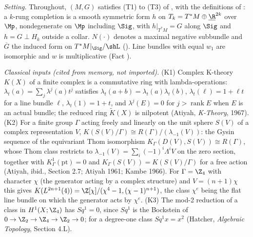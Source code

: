 \emph{Setting.} Throughout, $(M,G)$ satisfies (T1) to (T3) of , with the definitions of : a $k$-rung completion is a smooth symmetric form $h$ on $T_k = T^*M \oplus \underline{\R}^{2k}$ over $\Mp$, nondegenerate on $\Mp$ including $\Sig$, with $h|_{T^*M} = G$ along $\Sig$ and $h = G \perp H_k$ outside a collar. $N(\cdot)$ denotes a maximal negative subbundle and $\overline G$ the induced form on $T^*M|_\Sig/\shL$ (). Line bundles with equal $w_1$ are isomorphic and $w$ is multiplicative (Fact ).

\emph{Classical inputs (cited from memory, not imported).} (K1) Complex K-theory $K(X)$ of a finite complex is a commutative ring with lambda-operations: $\lambda_t(a) = \sum_{j} \lambda^{j}(a) t^{j}$ satisfies $\lambda_t(a + b) = \lambda_t(a)\lambda_t(b)$, $\lambda_t(\ell) = 1 + \ell t$ for a line bundle $\ell$, $\lambda_t(1) = 1 + t$, and $\lambda^{j}(E) = 0$ for $j > \operatorname{rank} E$ when $E$ is an actual bundle; the reduced ring $\widetilde K(X)$ is nilpotent (Atiyah, \emph{K-Theory}, 1967). (K2) For a finite group $\Gamma$ acting freely and linearly on the unit sphere $S(V)$ of a complex representation $V$, $K(S(V)/\Gamma) \cong R(\Gamma)/(\lambda_{-1}(V))$: the Gysin sequence of the equivariant Thom isomorphism $K_\Gamma(D(V), S(V)) \cong R(\Gamma)$, whose Thom class restricts to $\lambda_{-1}(V) = \sum_i (-1)^{i}\Lambda^{i}V$ on the zero section, together with $K^{1}_\Gamma(\mathrm{pt}) = 0$ and $K_\Gamma(S(V)) = K(S(V)/\Gamma)$ for a free action (Atiyah, ibid., Section 2.7; Atiyah 1961; Kambe 1966). For $\Gamma = \Z_{4}$ with character $\chi$ (the generator acting by a complex structure) and $V = (n+1)\chi$ this gives $K(L^{2n+1}(4)) = \Z[\chi]/(\chi^{4} - 1, (\chi - 1)^{n+1})$, the class $\chi^{e}$ being the flat line bundle on which the generator acts by $\chi^{e}$. (K3) The mod-2 reduction of a class in $H^{1}(X; \Z_{4})$ has $Sq^{1} = 0$, since $Sq^{1}$ is the Bockstein of $0 \to \Z_{2} \to \Z_{4} \to \Z_{2} \to 0$; for a degree-one class $Sq^{1}x = x^{2}$ (Hatcher, \emph{Algebraic Topology}, Section 4.L).

